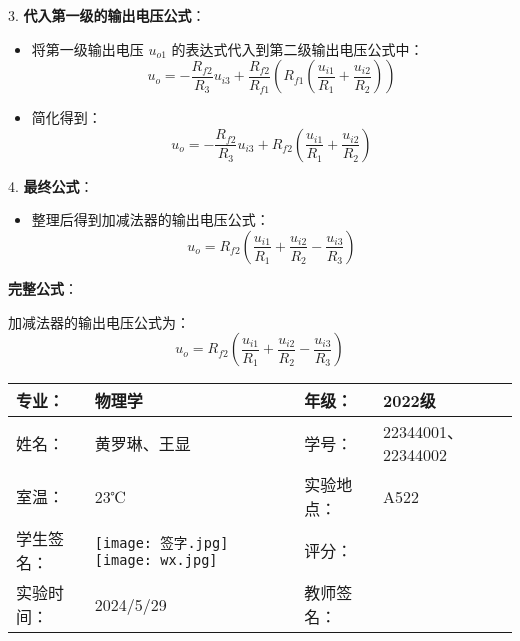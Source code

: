 \documentclass[dvipsnames, svgnames,a4paper,11pt]{article}
\begin{document}
3. \textbf{代入第一级的输出电压公式}：
    \begin{itemize}
        \item 将第一级输出电压 \(u_{o1}\) 的表达式代入到第二级输出电压公式中：
        \begin{equation}
        u_{o} = -\frac{R_{f2}}{R_{3}} u_{i3} + \frac{R_{f2}}{R_{f1}} \left( R_{f1} \left( \frac{u_{i1}}{R_{1}} + \frac{u_{i2}}{R_{2}} \right) \right)
        \end{equation}
        \item 简化得到：
        \begin{equation}
        u_{o} = -\frac{R_{f2}}{R_{3}} u_{i3} + R_{f2} \left( \frac{u_{i1}}{R_{1}} + \frac{u_{i2}}{R_{2}} \right)
        \end{equation}
    \end{itemize}

4. \textbf{最终公式}：
    \begin{itemize}
        \item 整理后得到加减法器的输出电压公式：
        \begin{equation}
        u_{o} = R_{f2} \left( \frac{u_{i1}}{R_{1}} + \frac{u_{i2}}{R_{2}} - \frac{u_{i3}}{R_{3}} \right)
        \end{equation}
    \end{itemize}

\textbf{完整公式}：

加减法器的输出电压公式为：
\begin{equation}
u_{o} = R_{f2} \left( \frac{u_{i1}}{R_{1}} + \frac{u_{i2}}{R_{2}} - \frac{u_{i3}}{R_{3}} \right)
\end{equation}
	
	
	
	
	\clearpage
	
	\begin{table}
		\renewcommand\arraystretch{1.7}
		\centering
		\begin{tabularx}{\textwidth}{|X|X|X|X|}
			\hline
			专业： & 物理学 & 年级： & 2022级 \\
			\hline
			姓名： & 黄罗琳、王显 & 学号： &22344001、22344002 \\
			\hline
			室温： & 23℃ & 实验地点： & A522 \\
			\hline
			学生签名：& \texttt{[image: 签字.jpg]} \texttt{[image: wx.jpg]} & 评分： &\\
			\hline
			实验时间：& 2024/5/29 & 教师签名：&\\
			\hline
		\end{tabularx}
	\end{table}
	
\end{document}

